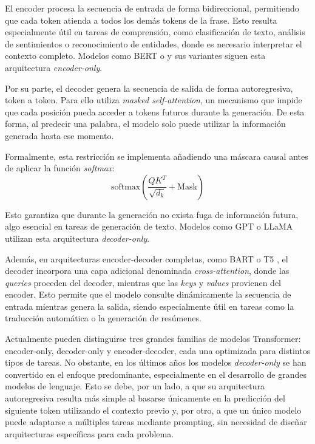 El encoder procesa la secuencia de entrada de forma bidireccional, permitiendo que cada token atienda a todos los demás tokens de la frase. Esto resulta especialmente útil en tareas de comprensión, como clasificación de texto, análisis de sentimientos o reconocimiento de entidades, donde es necesario interpretar el contexto completo. Modelos como \acs{BERT} o y sus variantes siguen esta arquitectura \textit{encoder-only}.

Por su parte, el decoder genera la secuencia de salida de forma autoregresiva, token a token. Para ello utiliza \textit{masked self-attention}, un mecanismo que impide que cada posición pueda acceder a tokens futuros durante la generación. De esta forma, al predecir una palabra, el modelo solo puede utilizar la información generada hasta ese momento.

Formalmente, esta restricción se implementa añadiendo una máscara causal antes de aplicar la función \textit{softmax}:
\begin{equation*}
	\text{softmax}
	\left(
	\frac{QK^T}{\sqrt{d_k}}
	+
	\text{Mask}
	\right)
\end{equation*}

Esto garantiza que durante la generación no exista fuga de información futura, algo esencial en tareas de generación de texto. Modelos como \ac{GPT} o LLaMA utilizan esta arquitectura \textit{decoder-only}.

Además, en arquitecturas encoder-decoder completas, como BART \cite{lewis_bart_2019} o T5 \cite{raffel_exploring_2020}, el decoder incorpora una capa adicional denominada \textit{cross-attention}, donde las \textit{queries} proceden del decoder, mientras que las \textit{keys} y \textit{values} provienen del encoder. Esto permite que el modelo consulte dinámicamente la secuencia de entrada mientras genera la salida, siendo especialmente útil en tareas como la traducción automática o la generación de resúmenes.

Actualmente pueden distinguirse tres grandes familias de modelos Transformer: encoder-only, decoder-only y encoder-decoder, cada una optimizada para distintos tipos de tareas. No obstante, en los últimos años los modelos \textit{decoder-only} se han convertido en el enfoque predominante, especialmente en el desarrollo de grandes modelos de lenguaje. Esto se debe, por un lado, a que su arquitectura autoregresiva resulta más simple al basarse únicamente en la predicción del siguiente token utilizando el contexto previo y, por otro, a que un único modelo puede adaptarse a múltiples tareas mediante prompting, sin necesidad de diseñar arquitecturas específicas para cada problema.


